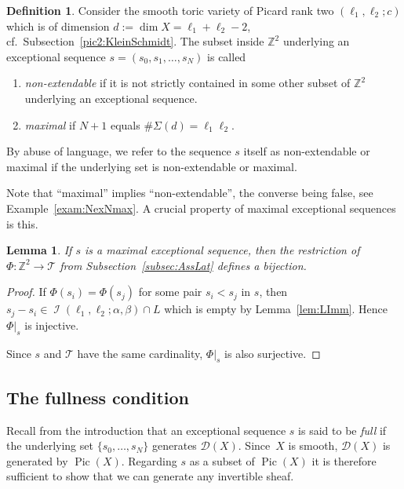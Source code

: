 \documentclass[11pt]{article}
\newtheorem{lemma}[theo]{Lemma}
\theoremstyle{definition}
\newtheorem{defi}[theo]{Definition}
\numberwithin{equation}{section}
\newcommand{\Z}{\mathbb Z}
\newcommand{\CD}{{\mathcal D}}
\newcommand{\CI}{{\mathcal I}}
\newcommand{\CT}{{\mathcal T}}
\newcommand{\Pic}{\operatorname{Pic}}
\newcommand{\nImm}{\operatorname{\CI}}
\newcommand{\xa}{\alpha}
\newcommand{\xb}{\beta}
\newcommand{\cl}{s}
\newcommand{\tm}{maximal}
\newcommand{\nex}{non-extendable}
\renewcommand{\sharp}{\#}
\newcommand{\ssect}[1]{Subsection~\ref{#1}}
\begin{document}
\begin{defi}
\label{def:MaxExc}
Consider the smooth toric 
variety of Picard rank two 
$(\ell_1,\ell_2;c)$ which
is of dimension $d:=\dim X=\ell_1+\ell_2-2$,
cf.~\ssect{pic2:KleinSchmidt}. The 
subset inside $\Z^2$ underlying 
an exceptional sequence 
$\cl=(\cl_0,\cl_1,\ldots,\cl_N)$ 
is called
\begin{enumerate}
\item[(i)] 
{\em \nex} if it is not strictly contained 
in some other subset of $\Z^2$ underlying 
an exceptional sequence.
\vspace{1ex}
\item[(ii)] 
{\em \tm} if $N+1$ equals 
$\sharp\Sigma(d)=\ell_1\ell_2$.
\end{enumerate}
By abuse of language, we refer to the 
sequence $\cl$ itself as {\nex} or {\tm} 
if the underlying set is {\nex} or {\tm}. 
\end{defi}

Note that ``\tm'' implies ``\nex'', 
the converse being false, see 
Example~\ref{exam:NexNmax}. A crucial 
property of maximal exceptional sequences 
is this. 

\begin{lemma}
\label{lem:PhiMap}
If $\cl$ is a maximal exceptional sequence, 
then the restriction of $\Phi:\Z^2\to\CT$ 
from \ssect{subsec:AssLat}
defines a bijection.
\end{lemma}

\begin{proof}
If $\Phi(\cl_i)=\Phi(\cl_j)$ for some pair 
$\cl_i<\cl_j$ in $\cl$, then $\cl_j-\cl_i
\in\nImm(\ell_1,\ell_2;\xa,\xb)\cap L$ which 
is empty by Lemma~\ref{lem:LImm}. Hence 
$\Phi|_\cl$ is injective.

Since $\cl$ and $\CT$ have the same cardinality, 
$\Phi|_\cl$ is also surjective.
\end{proof}

\subsection{The fullness condition}
\label{subsec:FullCond}
Recall from the introduction that an 
exceptional sequence $\cl$ is said to 
be {\em full} if the underlying set 
$\{\cl_0,\ldots,\cl_N\}$ generates 
$\CD(X)$. Since~$X$ is smooth, 
$\CD(X)$ is generated by $\Pic(X)$. 
Regarding $\cl$ as a subset of $\Pic(X)$ 
it is therefore sufficient to show that 
we can generate any invertible sheaf.
\end{document}
